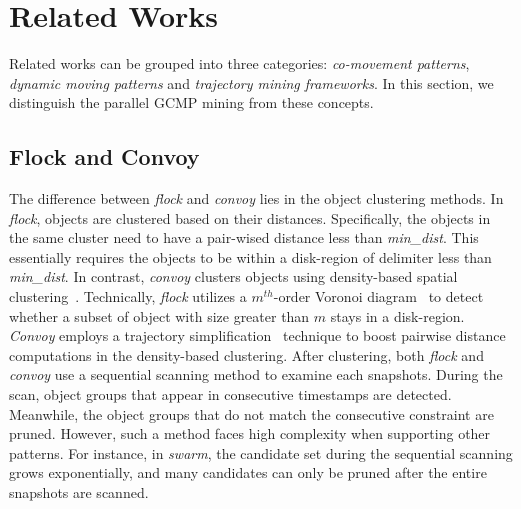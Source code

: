 \section{Related Works}
\label{sec:related_works}
Related works can be grouped into three categories: \emph{co-movement patterns},
\emph{dynamic moving patterns} and \emph{trajectory mining frameworks}.
In this section, we distinguish the parallel GCMP mining from these concepts.


\subsection{Flock and Convoy}
The difference between \emph{flock} and \emph{convoy} lies 
in the object clustering methods. In \emph{flock},
objects are clustered based on their distances. Specifically, the
objects in the same cluster need to have a pair-wised distance less than \emph{min\_dist}. 
This essentially requires the objects to be within a disk-region of delimiter less than \emph{min\_dist}.
In contrast, \emph{convoy} clusters objects using density-based spatial clustering~\cite{ester1996density}.
Technically, \emph{flock} utilizes a $m^{th}$-order Voronoi diagram~\cite{laube2005finding} to detect whether
a subset of object with size greater than $m$ stays in a disk-region. \emph{Convoy} employs
a trajectory simplification~\cite{douglas1973linesimplification} technique to boost pairwise distance computations in
the density-based clustering.
After clustering, both \emph{flock} and \emph{convoy} use a sequential scanning
method to examine each snapshots. During the scan, object
groups that appear in consecutive timestamps are detected. Meanwhile, the object groups that do not
match the consecutive constraint are pruned. 
However, such a method faces high complexity when supporting other patterns.
For instance, in \emph{swarm}, the candidate set during the sequential scanning grows
exponentially, and many candidates can only be pruned after the entire snapshots are scanned.

